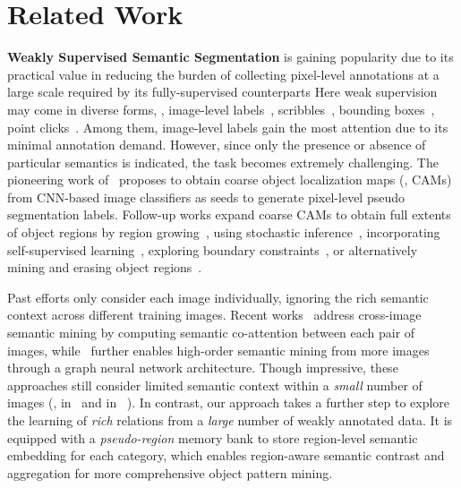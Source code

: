 \documentclass[10pt,twocolumn,letterpaper]{article}
\begin{document}
\section{Related Work}\label{sec:relatedwork}


\noindent\textbf{Weakly Supervised Semantic Segmentation} is gaining popularity due to its practical value in reducing the burden of collecting pixel-level annotations at a large scale required by its fully-supervised counterparts \cite{wang2021hierarchical,zhou2021differentiable,zhou2020motion,zhou2021target,wang2021survey}
Here weak supervision may come in diverse forms, \eg, image-level labels~\cite{wei2016stc,chaudhry2017discovering,zhang2020causal,zhou2021group,wang2021multiple}, scribbles~\cite{lin2016scribblesup,vernaza2017learning}, bounding boxes~\cite{dai2015boxsup,khoreva2017simple,song2019box,oh2021background},  point clicks~\cite{bearman2016s,ke2021universal}. Among them, image-level labels gain the most attention due to its minimal annotation demand. However, since only the presence or absence of particular semantics is indicated, the task becomes extremely challenging. The pioneering work of~\cite{zhou2016learning} proposes to obtain coarse object localization maps (\ie, CAMs) from CNN-based image classifiers as seeds to generate pixel-level pseudo segmentation labels. Follow-up works expand coarse CAMs to obtain full extents of object regions by region growing~\cite{kolesnikov2016seed,wei2018revisiting,huang2018weakly}, using stochastic inference~\cite{lee2019ficklenet}, incorporating self-supervised learning~\cite{chang2020weakly, shimoda2019self, wang2020self}, exploring boundary constraints~\cite{chenweakly, lee2021railroad}, or alternatively mining and erasing object regions~\cite{hou2018self, wei2017object, li2018tell}. 


Past efforts only consider each image individually, ignoring the rich semantic context across different training images. Recent works~\cite{fan2020cian, sun2020mining} address cross-image semantic mining by computing semantic co-attention between each pair of images, while~\cite{zhou2021group} further enables high-order semantic mining from more images through a graph neural network architecture. Though impressive, these approaches still consider limited semantic context within a \textit{small} number of images (\ie,  in~\cite{fan2020cian, sun2020mining} and  in ~\cite{zhou2021group}). 
In contrast, our approach takes a further step to explore the learning of \emph{rich} relations from a \emph{large} number of weakly annotated data.  It is equipped with a \emph{pseudo-region} memory bank to store region-level semantic embedding for each category, which enables region-aware semantic contrast and aggregation for more comprehensive object pattern mining. 
\end{document}
